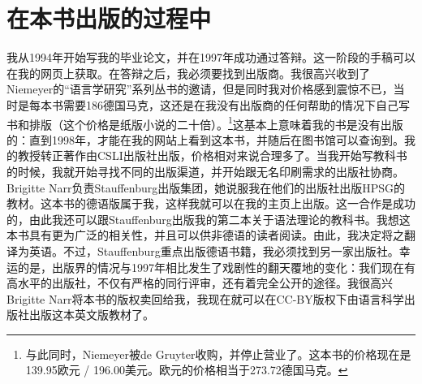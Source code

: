 \section*{在本书出版的过程中}

我从1994年开始写我的毕业论文，并在1997年成功通过答辩。这一阶段的手稿可以在我的网页上获取。在答辩之后，我必须要找到出版商。我很高兴收到了Niemeyer的“语言学研究”系列丛书的邀请，但是同时我对价格感到震惊不已，当时是每本书需要186德国马克，这还是在我没有出版商的任何帮助的情况下自己写书和排版（这个价格是纸版小说的二十倍）。\footnote{%
与此同时，Niemeyer被de Gruyter收购，并停止营业了。这本书的价格现在是139.95欧元 / 196.00美元。欧元的价格相当于273.72德国马克。
}这基本上意味着我的书是没有出版的：直到1998年，才能在我的网站上看到这本书，并随后在图书馆可以查询到。我的教授转正著作由CSLI出版社出版，价格相对来说合理多了。当我开始写教科书的时候，我就开始寻找不同的出版渠道，并开始跟无名印刷需求的出版社协商。Brigitte Narr负责Stauffenburg出版集团，她说服我在他们的出版社出版HPSG的教材。这本书的德语版属于我，这样我就可以在我的主页上出版。这一合作是成功的，由此我还可以跟Stauffenburg出版我的第二本关于语法理论的教科书。我想这本书具有更为广泛的相关性，并且可以供非德语的读者阅读。由此，我决定将之翻译为英语。不过，Stauffenburg重点出版德语书籍，我必须找到另一家出版社。幸运的是，出版界的情况与1997年相比发生了戏剧性的翻天覆地的变化：我们现在有高水平的出版社，不仅有严格的同行评审，还有着完全公开的途径。我很高兴Brigitte Narr将本书的版权卖回给我，我现在就可以在CC-BY版权下由语言科学出版社出版这本英文版教材了。
